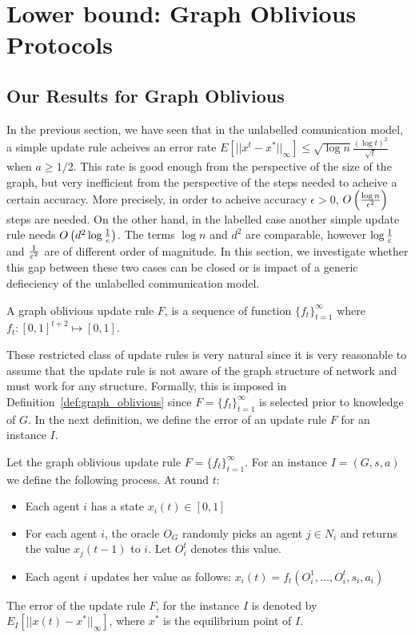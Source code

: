 \section{Lower bound: Graph Oblivious Protocols}

\subsection{Our Results for Graph Oblivious}
In the previous section, we have seen that in the unlabelled comunication model, a simple update rule acheives an error rate $E[||x^t-x^*||_{\infty}] \leq \sqrt{\log n}\frac{(\log t)^2}{\sqrt{t}}$ when $a\geq 1/2$. This rate is good enough from the perspective of the size of the graph, but very inefficient from the perspective of the steps needed to acheive a certain accuracy. More precisely, in order to acheive accuracy $\epsilon>0$, $O\left(\frac{\log n}{\epsilon^2}\right)$ steps are needed. On the other hand, in the labelled case another simple update rule needs $O\left(d^2\log \frac{1}{\epsilon}\right)$. The terms $\log n$ and $d^2$ are comparable, however $\log \frac{1}{\varepsilon}$ and $\frac{1}{\varepsilon^2}$ are of different order of magnitude. In this section, we investigate whether this gap between these two cases can be closed or is impact of a generic defieciency of the unlabelled communication model.   

\begin{definition}\label{def:graph_oblivious}
A graph oblivious update rule $F$, is a sequence of function $\{f_t\}_{t=1}^{\infty}$ where $f_t: [0,1]^{t+2} \mapsto [0,1]$.
\end{definition}

\noindent These restricted class of update rules is very natural since it is very reasonable to assume that the update rule is not aware of the graph structure of network and must work for any structure. Formally, this is imposed in Definition~\ref{def:graph_oblivious} since $F=\{f_t\}_{t=1}^{\infty}$ is selected prior to knowledge of $G$. In the next definition, we define the error of an update rule $F$ for an instance $I$.  
\begin{definition}\label{Graph Oblivious Updates Rules}
Let the graph oblivious update rule $F = \{f_t\}_{t=1}^{\infty}$. For an instance $I=(G,s,a)$ we define the following process. At round $t$:
\begin{itemize}
 \item Each agent $i$ has a state $x_i(t) \in [0,1]$
 \item For each agent $i$, the oracle $O_G$ randomly picks an agent $j \in N_i$ and returns the value $x_j(t-1)$ to $i$. Let $O_i^t$ denotes this value.
 \item Each agent $i$ updates her value as follows: $x_i(t) = f_t(O_i^1,\ldots,O_i^t,s_i,a_i)$
\end{itemize}
The error of the update rule $F$, for the instance $I$ is denoted by $E_I[||x(t)-x^*||_\infty]$, where $x^*$ is the equilibrium point of $I$.
\end{definition}

